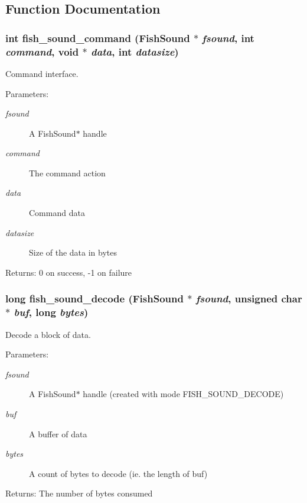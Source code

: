 \subsection{Function Documentation}
\subsubsection{\setlength{\rightskip}{0pt plus 5cm}int fish\_\-sound\_\-command ({\bf Fish\-Sound} $\ast$ {\em fsound}, int {\em command}, void $\ast$ {\em data}, int {\em datasize})}\label{fishsound_8h_a11}


Command interface. 

\begin{Desc}
\item[Parameters:]
\begin{description}
\item[{\em fsound}]A Fish\-Sound$\ast$ handle \item[{\em command}]The command action \item[{\em data}]Command data \item[{\em datasize}]Size of the data in bytes \end{description}
\end{Desc}
\begin{Desc}
\item[Returns:]0 on success, -1 on failure \end{Desc}
\subsubsection{\setlength{\rightskip}{0pt plus 5cm}long fish\_\-sound\_\-decode ({\bf Fish\-Sound} $\ast$ {\em fsound}, unsigned char $\ast$ {\em buf}, long {\em bytes})}\label{fishsound_8h_a7}


Decode a block of data. 

\begin{Desc}
\item[Parameters:]
\begin{description}
\item[{\em fsound}]A Fish\-Sound$\ast$ handle (created with mode FISH\_\-SOUND\_\-DECODE) \item[{\em buf}]A buffer of data \item[{\em bytes}]A count of bytes to decode (ie. the length of buf) \end{description}
\end{Desc}
\begin{Desc}
\item[Returns:]The number of bytes consumed \end{Desc}
